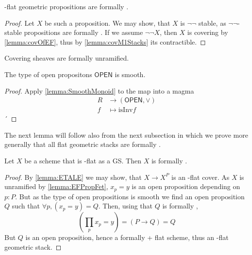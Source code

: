 \begin{lemma}{\label{lemma:EFPropFet}}
	\etale-flat geometric propositions are formally \etale.
\end{lemma}
\begin{proof}
	Let $X$ be such a proposition.
	We may show, that $X$ is $\lnot \lnot$ stable, as $\lnot \lnot$-stable propositions are formally \etale. If we assume $\lnot \lnot X$, then $X$ is covering by \ref{lemma:covOfEF}, thus by \ref{lemma:covM1Stacks} its contractible.
\end{proof}
\begin{corollary}
	Covering sheaves are formally unramified.
\end{corollary}
\begin{lemma}{\label{lemma:OpenIsSmooth}}
	The type of open propositons $\mathsf{OPEN}$ is smooth. 
\end{lemma}
\begin{proof}

	Apply \ref{lemma:SmoothMonoid} to the map into a magma
	\begin{align*} 
		R &\to (\mathsf{OPEN} , \lor) \\
		f &\mapsto \mathrm{isInv} f %
	\end{align*}´
\end{proof}




The next lemma will follow also from the next subsection in which we prove more generally that all \etale flat geometric stacks are formally \etale.
\begin{lemma}{\label{lemma:schemeEFIsFEt}}
	Let $X$ be a scheme that is \etale-flat as a GS. Then $X$ is formally \etale.
\end{lemma}
\begin{proof}
	By \ref{lemma:ETALE} we may show, that $X \to X^P$ is an \etale-flat cover. 	As $X$ is unramified by \ref{lemma:EFPropFet}, $x_p = y$ is an open proposition depending on $p : P$. But as the type of open propositions is smooth we find an open proposition $Q$ such that $\forall p, (x_p = y) = Q$. Then, using that $Q$ is formally \etale, %
	\[(\prod_{p} x_p = y) = (P \to Q) = Q\] %
	But $Q$ is an open proposition, hence a formally \etale + flat scheme, thus an \etale-flat geometric stack.		
	
\end{proof}

